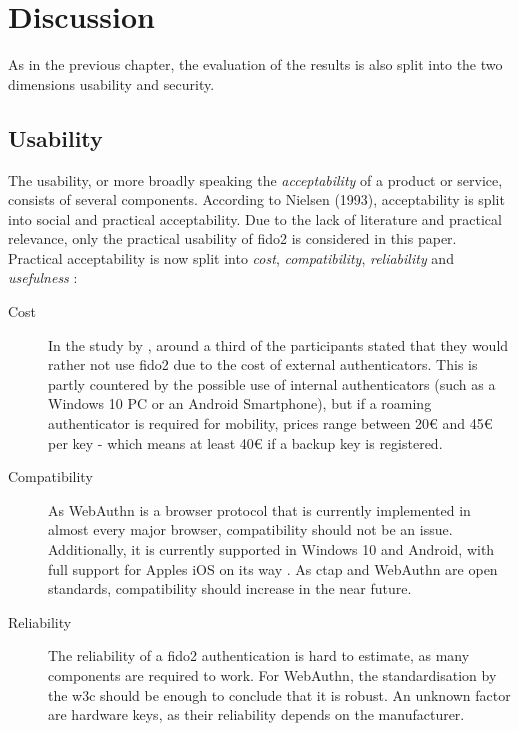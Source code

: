 
\section{Discussion}
\label{sec:discussion}

As in the previous chapter, the evaluation of the results is also split into the two dimensions usability and security.

\subsection{Usability}

The usability, or more broadly speaking the \emph{acceptability} of a product or service, consists of several components. According to Nielsen (1993), acceptability is split into social and practical acceptability. Due to the lack of literature and practical relevance, only the practical usability of \ac{fido2} is considered in this paper.\\
Practical acceptability is now split into \emph{cost}, \emph{compatibility}, \emph{reliability} and \emph{usefulness} \cite[25 \psq]{nielsen1993}:

\begin{description}
    \item[Cost] In the study by \cite{lyastani2020}, around a third of the participants stated that they would rather not use \ac{fido2} due to the cost of external authenticators. This is partly countered by the possible use of internal authenticators (such as a Windows 10 PC or an Android Smartphone), but if a roaming authenticator is required for mobility, prices range between 20€ and 45€ per key \cite{yubikey_5_nfc} - which means at least 40€ if a backup key is registered.
    \item[Compatibility] As WebAuthn is a browser protocol that is currently implemented in almost every major browser, compatibility should not be an issue. Additionally, it is currently supported in Windows 10 and Android, with full support for Apples iOS on its way \cite{nichols2020}. As \ac{ctap} and WebAuthn are open standards, compatibility should increase in the near future.
    \item[Reliability] The reliability of a \ac{fido2} authentication is hard to estimate, as many components are required to work. For WebAuthn, the standardisation by the \ac{w3c} should be enough to conclude that it is robust. An unknown factor are hardware keys, as their reliability depends on the manufacturer.
\end{description}

